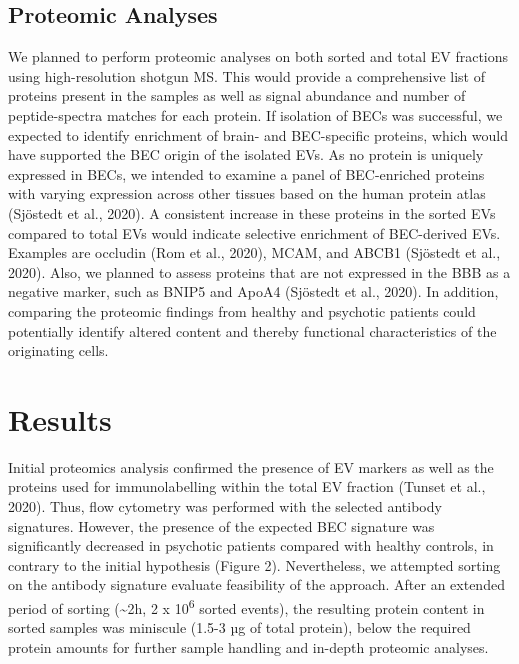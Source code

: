 \documentclass[authordate, empirical, issue]{jote-new-article}
\begin{document}
	



	\emph{ }



	\subsection{Proteomic Analyses}



	We planned to perform proteomic analyses on both sorted and total EV fractions using high-resolution shotgun MS. This would provide a comprehensive list of proteins present in the samples as well as signal abundance and number of peptide-spectra matches for each protein. If isolation of BECs was successful, we expected to identify enrichment of brain- and BEC-specific proteins, which would have supported the BEC origin of the isolated EVs. As no protein is uniquely expressed in BECs, we intended to examine a panel of BEC-enriched proteins with varying expression across other tissues based on the human protein atlas (Sjöstedt et al., 2020). A consistent increase in these proteins in the sorted EVs compared to total EVs would indicate selective enrichment of BEC-derived EVs. Examples are occludin (Rom et al., 2020), MCAM, and ABCB1 (Sjöstedt et al., 2020). Also, we planned to assess proteins that are not expressed in the BBB as a negative marker, such as BNIP5 and ApoA4 (Sjöstedt et al., 2020). In addition, comparing the proteomic findings from healthy and psychotic patients could potentially identify altered content and thereby functional characteristics of the originating cells.



	\section{Results}



	Initial proteomics analysis confirmed the presence of EV markers as well as the proteins used for immunolabelling within the total EV fraction (Tunset et al., 2020). Thus, flow cytometry was performed with the selected antibody signatures. However, the presence of the expected BEC signature was significantly decreased in psychotic patients compared with healthy controls, in contrary to the initial hypothesis (Figure 2). Nevertheless, we attempted sorting on the antibody signature evaluate feasibility of the approach. After an extended period of sorting (\textasciitilde{}2h, 2 x 10\textsuperscript{6} sorted events), the resulting protein content in sorted samples was miniscule (1.5-3 µg of total protein), below the required protein amounts for further sample handling and in-depth proteomic analyses.
\end{document}
